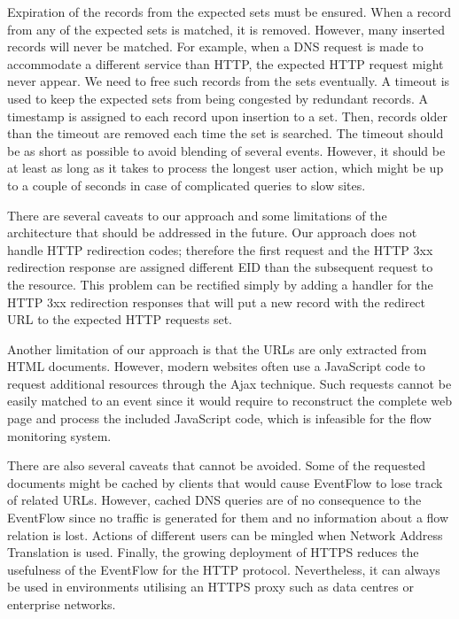 Expiration of the records from the expected sets must be ensured. When a record from any of the expected sets is matched, it is removed. However, many inserted records will never be matched. For example, when a DNS request is made to accommodate a different service than HTTP, the expected HTTP request might never appear. We need to free such records from the sets eventually. A timeout is used to keep the expected sets from being congested by redundant records. A timestamp is assigned to each record upon insertion to a set. Then, records older than the timeout are removed each time the set is searched. The timeout should be as short as possible to avoid blending of several events. However, it should be at least as long as it takes to process the longest user action, which might be up to a couple of seconds in case of complicated queries to slow sites.

There are several caveats to our approach and some limitations of the architecture that should be addressed in the future. Our approach does not handle HTTP redirection codes; therefore the first request and the HTTP 3xx redirection response are assigned different EID than the subsequent request to the resource. This problem can be rectified simply by adding a handler for the HTTP 3xx redirection responses that will put a new record with the redirect URL to the expected HTTP requests set.

Another limitation of our approach is that the URLs are only extracted from HTML documents. However, modern websites often use a JavaScript code to request additional resources through the Ajax technique. Such requests cannot be easily matched to an event since it would require to reconstruct the complete web page and process the included JavaScript code, which is infeasible for the flow monitoring system.

There are also several caveats that cannot be avoided. Some of the requested documents might be cached by clients that would cause EventFlow to lose track of related URLs. However, cached DNS queries are of no consequence to the EventFlow since no traffic is generated for them and no information about a flow relation is lost. Actions of different users can be mingled when Network Address Translation is used. Finally, the growing deployment of HTTPS reduces the usefulness of the EventFlow for the HTTP protocol. Nevertheless, it can always be used in environments utilising an HTTPS proxy such as data centres or enterprise networks.



